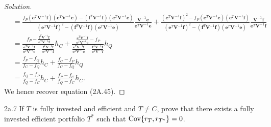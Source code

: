\begin{proof}[Solution]
\begin{align*}
&= \frac{f_{P}(\mathbf{e}^{T}\mathbf{V}^{-1}\mathbf{f})(\mathbf{e}^{T}\mathbf{V}^{-1}\mathbf{e}) - (\mathbf{f}^{T}\mathbf{V}^{-1}\mathbf{f})(\mathbf{e}^{T}\mathbf{V}^{-1}\mathbf{e})}{(\mathbf{e}^{T}\mathbf{V}^{-1}\mathbf{f})^{2} - (\mathbf{f}^{T}\mathbf{V}^{-1}\mathbf{f})(\mathbf{e}^{T}\mathbf{V}^{-1}\mathbf{e})}\frac{\mathbf{V}^{-1}\mathbf{e}}{\mathbf{e}^{T}\mathbf{V}^{-1}\mathbf{e}} + \frac{(\mathbf{e}^{T}\mathbf{V}^{-1}\mathbf{f})^{2} - f_{P}(\mathbf{e}^{T}\mathbf{V}^{-1}\mathbf{e})(\mathbf{e}^{T}\mathbf{V}^{-1}\mathbf{f})}{(\mathbf{e}^{T}\mathbf{V}^{-1}\mathbf{f})^{2} - (\mathbf{f}^{T}\mathbf{V}^{-1}\mathbf{f})(\mathbf{e}^{T}\mathbf{V}^{-1}\mathbf{e})}\frac{\mathbf{V}^{-1}\mathbf{f}}{\mathbf{e}^{T}\mathbf{V}^{-1}\mathbf{f}}\\
&= \frac{f_{P} - \frac{\mathbf{f}^{T}\mathbf{V}^{-1}\mathbf{f}}{\mathbf{e}^{T}\mathbf{V}^{-1}\mathbf{f}}}{\frac{\mathbf{e}^{T}\mathbf{V}^{-1}\mathbf{f}}{\mathbf{e}^{T}\mathbf{V}^{-1}\mathbf{e}} - \frac{\mathbf{f}^{T}\mathbf{V}^{-1}\mathbf{f}}{\mathbf{e}^{T}\mathbf{V}^{-1}\mathbf{f}}}h_{C} + \frac{\frac{\mathbf{e}^{T}\mathbf{V}^{-1}\mathbf{f}}{\mathbf{e}^{T}\mathbf{V}^{-1}\mathbf{e}} - f_{P}}{\frac{\mathbf{e}^{T}\mathbf{V}^{-1}\mathbf{f}}{\mathbf{e}^{T}\mathbf{V}^{-1}\mathbf{e}} - \frac{\mathbf{f}^{T}\mathbf{V}^{-1}\mathbf{f}}{\mathbf{e}^{T}\mathbf{V}^{-1}\mathbf{f}}}h_{Q}\\
&= \frac{f_{P} - f_{Q}}{f_{C} - f_{Q}}h_{C} + \frac{f_{C} - f_{P}}{f_{C} - f_{Q}}h_{Q}\\
&= \frac{f_{Q} - f_{P}}{f_{Q} - f_{C}}h_{C} + \frac{f_{P} - f_{C}}{f_{Q} - f_{C}}h_{C}.
\end{align*}
We hence recover equation (2A.45).
\end{proof}


\begin{problem}{2a.7}
If $T$ is fully invested and efficient and $T \neq C$, prove that there exists a fully invested efficient portfolio $T^{\ast}$ such that $\mathrm{Cov}\{r_{T}, r_{T^{\ast}}\} = 0$.
\end{problem}

